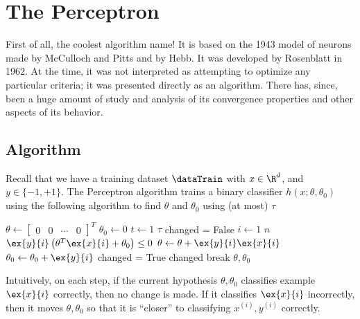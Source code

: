 \chapter{The Perceptron}
\label{chap-perceptron}
First of all, the coolest algorithm name! 
It is based on the 1943 model of neurons made by McCulloch and Pitts
and by Hebb.  It was developed by Rosenblatt in 1962.  At the time, it
was not interpreted as attempting to optimize any particular criteria;
it was presented directly as an algorithm.  There has, since, been a
huge amount of study and analysis of its convergence properties and
other aspects of its behavior.

\section{Algorithm}

Recall that we have a training dataset $\dataTrain$ with $x \in \R^d$,
and $y\in \{-1, +1\}$.  The Perceptron algorithm trains a binary
classifier $h(x; \theta, \theta_0)$ using the following algorithm to
find $\theta$ and $\theta_0$ using (at most) $\tau$ 

\begin{codebox}
  \li $\theta \gets
    \begin{bmatrix}
      0 & 0 & \cdots & 0
    \end{bmatrix}^T$
  \li $\theta_0 \gets 0$
  \li \For $t \gets 1$ \To $\tau$
  \li   \Do
  changed = False
  \li        \For $i \gets 1$ \To $n$
  \li       \Do
  \If $\ex{y}{i}\left(\theta^T\ex{x}{i} + \theta_0\right) \le 0$
  \li           \Then
  $\theta \gets \theta + \ex{y}{i}\ex{x}{i}$
  \li             $\theta_0 \gets \theta_0 + \ex{y}{i}$
  \li             changed = True
  \End
  \End
  \li      {} changed
  \li          \Then
  break
  \End
  \End
  \li \Return $\theta, \theta_0$
\end{codebox}


Intuitively, on each step, if the current hypothesis
$\theta, \theta_0$ classifies example $\ex{x}{i}$ correctly, then no
change is made.  If it classifies $\ex{x}{i}$ incorrectly, then it
moves $\theta, \theta_0$ so that it is ``closer'' to classifying
$x^{(i)}, y^{(i)}$ correctly.

